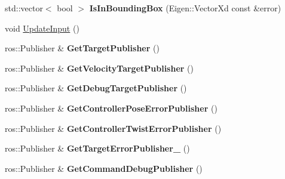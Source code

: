 \begin{DoxyCompactItemize}
\mbox{\label{classproc__control_1_1_robot_state_adfa32de4a1186578345d594923caffed}} 
std\+::vector$<$ bool $>$ {\bfseries Is\+In\+Bounding\+Box} (Eigen\+::\+Vector\+Xd const \&error)
\item 
void \hyperlink{classproc__control_1_1_robot_state_a8ab9a29a8c662c5ba536b592223cd299}{Update\+Input} ()
\item 
\mbox{\label{classproc__control_1_1_robot_state_a97857f848f7db1f6bca1f35ccebdf273}} 
ros\+::\+Publisher \& {\bfseries Get\+Target\+Publisher} ()
\item 
\mbox{\label{classproc__control_1_1_robot_state_af83f2a496c8e59603e33cf887bdb025e}} 
ros\+::\+Publisher \& {\bfseries Get\+Velocity\+Target\+Publisher} ()
\item 
\mbox{\label{classproc__control_1_1_robot_state_a87e0e4a33042daa238ff4909169ef7f7}} 
ros\+::\+Publisher \& {\bfseries Get\+Debug\+Target\+Publisher} ()
\item 
\mbox{\label{classproc__control_1_1_robot_state_a9e73897abc0115d583bce12145f2b8a0}} 
ros\+::\+Publisher \& {\bfseries Get\+Controller\+Pose\+Error\+Publisher} ()
\item 
\mbox{\label{classproc__control_1_1_robot_state_ac7eba49a0de746167da14a718b72595f}} 
ros\+::\+Publisher \& {\bfseries Get\+Controller\+Twist\+Error\+Publisher} ()
\item 
\mbox{\label{classproc__control_1_1_robot_state_a7f49f39bcee0634a0bfbbeeaf1d36c54}} 
ros\+::\+Publisher \& {\bfseries Get\+Target\+Error\+Publisher\+\_\+} ()
\item 
\mbox{\label{classproc__control_1_1_robot_state_a08a769b06acc423446b8eb5ec52a27b4}} 
ros\+::\+Publisher \& {\bfseries Get\+Command\+Debug\+Publisher} ()
\item 
\mbox{\label{classproc__control_1_1_robot_state_a19e06bd6302165fa915e0efcb1c59bff}} 

\end{DoxyCompactItemize}
